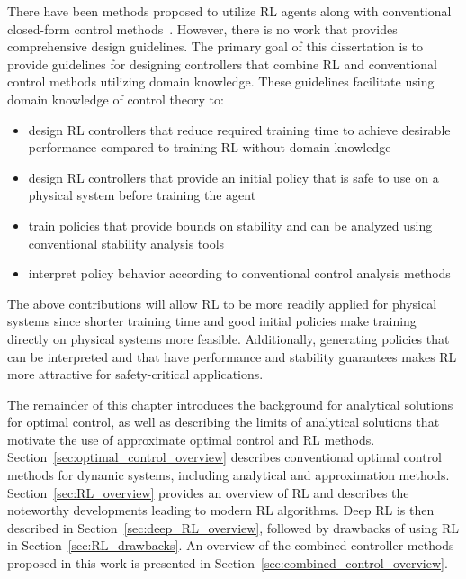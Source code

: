 There have been methods proposed to utilize RL agents along with conventional closed-form control methods~\cite{Wang:2007a,Johannink:2019a,Silver:2018a}. However, there is no work that provides comprehensive design guidelines.
The primary goal of this dissertation is to provide guidelines for designing controllers that combine RL and conventional control methods utilizing domain knowledge.
These guidelines facilitate using domain knowledge of control theory to:
\begin{itemize}
	\item design RL controllers that reduce required training time to achieve desirable performance compared to training RL without domain knowledge
	\item design RL controllers that provide an initial policy that is safe to use on a physical system before training the agent
	\item train policies that provide bounds on stability and can be analyzed using  conventional stability analysis tools
	\item interpret policy behavior according to conventional control analysis methods
\end{itemize}
%
The above contributions will allow RL to be more readily applied for physical systems since shorter training time and good initial policies make training directly on physical systems more feasible.
%
Additionally, generating policies that can be interpreted and that have performance and stability guarantees makes RL more attractive for safety-critical applications.

The remainder of this chapter introduces the background for analytical solutions for optimal control, as well as describing the limits of analytical solutions that motivate the use of approximate optimal control and RL methods.
Section~\ref{sec:optimal_control_overview} describes conventional optimal control methods for dynamic systems, including analytical and approximation methods. Section~\ref{sec:RL_overview} provides an overview of RL and describes the noteworthy developments leading to modern RL algorithms. Deep RL is then described in Section~\ref{sec:deep_RL_overview}, followed by drawbacks of using RL in Section~\ref{sec:RL_drawbacks}.  An overview of the combined controller methods proposed in this work is presented in Section~\ref{sec:combined_control_overview}.

